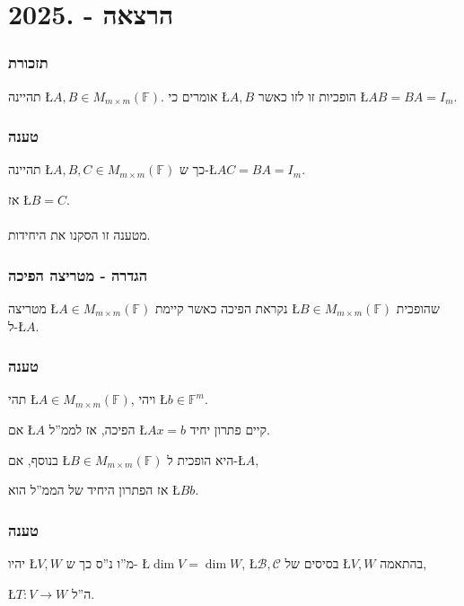\documentclass[english,hebrew]{article}
\begin{document}
\part{הרצאה {\endL} - {.2025\endL}}

\section{תזכורת}

תהיינה \L{$A,B\in M_{m\times m}(\mathbb{F})$}. אומרים כי \L{$A,B$}
הופכיות זו לזו כאשר \L{$AB=BA=I_{m}$}.

\section{טענה}

תהיינה \L{$A,B,C\in M_{m\times m}(\mathbb{F})$} כך ש-\L{$AC=BA=I_{m}$}.

אז \L{$B=C$}.\\
\\
מטענה זו הסקנו את היחידות.

\section{הגדרה - מטריצה הפיכה}

מטריצה \L{$A\in M_{m\times m}(\mathbb{F})$} נקראת הפיכה כאשר קיימת
\L{$B\in M_{m\times m}(\mathbb{F})$} שהופכית ל-\L{$A$}.

\section{טענה {\endL}}

תהי \L{$A\in M_{m\times m}(\mathbb{F})$}, ויהי \L{$b\in\mathbb{F}^{m}$}.

אם \L{$A$} הפיכה, אז לממ\textquotedblright ל \L{$Ax=b$} קיים פתרון
יחיד.

בנוסף, אם \L{$B\in M_{m\times m}(\mathbb{F})$} היא הופכית ל-\L{$A$},

אז הפתרון היחיד של הממ\textquotedblright ל הוא \L{$Bb$}.

\section{טענה}

יהיו \L{$V,W$} מ\textquotedblright ו נ\textquotedblright ס כך ש-
\L{$\dim V=\dim W$}, \L{$\mathcal{B},\mathcal{C}$} בסיסים של \L{$V,W$}
בהתאמה,

\L{$T:V\rightarrow W$} ה\textquotedblright ל.
\end{document}
